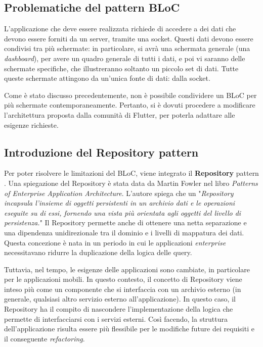 \subsection{Problematiche del pattern BLoC}
L'applicazione che deve essere realizzata richiede di accedere a dei dati che devono essere forniti da un server, tramite una socket. Questi dati devono essere condivisi tra più schermate: in particolare, si avrà una schermata generale (una \textit{dashboard}), per avere un quadro generale di tutti i dati, e poi vi saranno delle schermate specifiche, che illustreranno soltanto un piccolo set di dati. Tutte queste schermate attingono da un'unica fonte di dati: dalla socket.

Come è stato discusso precedentemente, non è possibile condividere un BLoC per più schermate contemporaneamente. Pertanto, si è dovuti procedere a modificare l'architettura proposta dalla comunità di Flutter, per poterla adattare alle esigenze richieste.

\subsection{Introduzione del Repository pattern}
Per poter risolvere le limitazioni del BLoC, viene integrato il \textbf{Repository} pattern \cite{repository_pattern}. Una spiegazione del Repository è stata data da Martin Fowler nel libro \textit{Patterns of Enterprise Application Architecture}. L'autore spiega che un "\textit{Repository incapsula l'insieme di oggetti persistenti in un archivio dati e le operazioni eseguite su di essi, fornendo una vista più orientata agli oggetti del livello di persistenza.}" Il Repository permette anche di ottenere una netta separazione e una dipendenza unidirezionale tra il dominio e i livelli di mappatura dei dati. Questa concezione è nata in un periodo in cui le applicazioni \textit{enterprise} necessitavano ridurre la duplicazione della logica delle query.

Tuttavia, nel tempo, le esigenze delle applicazioni sono cambiate, in particolare per le applicazioni mobili. In questo contesto, il concetto di Repository viene inteso più come un componente che si interfaccia con un archivio esterno (in generale, qualsiasi altro servizio esterno all'applicazione). In questo caso, il Repository ha il compito di nascondere l'implementazione della logica che permette di interfacciarsi con i servizi esterni. Così facendo, la struttura dell'applicazione risulta essere più flessibile per le modifiche future dei requisiti e il conseguente \textit{refactoring}.

